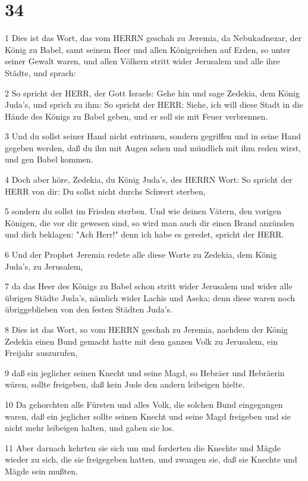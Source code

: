 \chapter{34}

\par 1 Dies ist das Wort, das vom HERRN geschah zu Jeremia, da Nebukadnezar, der König zu Babel, samt seinem Heer und allen Königreichen auf Erden, so unter seiner Gewalt waren, und allen Völkern stritt wider Jerusalem und alle ihre Städte, und sprach:
\par 2 So spricht der HERR, der Gott Israels: Gehe hin und sage Zedekia, dem König Juda's, und sprich zu ihm: So spricht der HERR: Siehe, ich will diese Stadt in die Hände des Königs zu Babel geben, und er soll sie mit Feuer verbrennen.
\par 3 Und du sollst seiner Hand nicht entrinnen, sondern gegriffen und in seine Hand gegeben werden, daß du ihn mit Augen sehen und mündlich mit ihm reden wirst, und gen Babel kommen.
\par 4 Doch aber höre, Zedekia, du König Juda's, des HERRN Wort: So spricht der HERR von dir: Du sollst nicht durchs Schwert sterben,
\par 5 sondern du sollst im Frieden sterben. Und wie deinen Vätern, den vorigen Königen, die vor dir gewesen sind, so wird man auch dir einen Brand anzünden und dich beklagen: "Ach Herr!" denn ich habe es geredet, spricht der HERR.
\par 6 Und der Prophet Jeremia redete alle diese Worte zu Zedekia, dem König Juda's, zu Jerusalem,
\par 7 da das Heer des Königs zu Babel schon stritt wider Jerusalem und wider alle übrigen Städte Juda's, nämlich wider Lachis und Aseka; denn diese waren noch übriggeblieben von den festen Städten Juda's.
\par 8 Dies ist das Wort, so vom HERRN geschah zu Jeremia, nachdem der König Zedekia einen Bund gemacht hatte mit dem ganzen Volk zu Jerusalem, ein Freijahr auszurufen,
\par 9 daß ein jeglicher seinen Knecht und seine Magd, so Hebräer und Hebräerin wären, sollte freigeben, daß kein Jude den andern leibeigen hielte.
\par 10 Da gehorchten alle Fürsten und alles Volk, die solchen Bund eingegangen waren, daß ein jeglicher sollte seinen Knecht und seine Magd freigeben und sie nicht mehr leibeigen halten, und gaben sie los.
\par 11 Aber darnach kehrten sie sich um und forderten die Knechte und Mägde wieder zu sich, die sie freigegeben hatten, und zwangen sie, daß sie Knechte und Mägde sein mußten.
